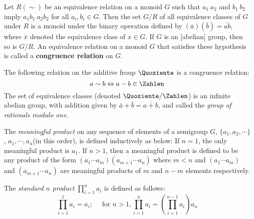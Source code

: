 \begin{theorem}
	Let $ R(\sim) $ be an equivalence relation on a monoid $ G $ such that $ a_1~a_2 $ and $ b_1~b_2 $ imply $ a_1 b_1 ~ a_2 b_2 $ for all $ a_i, b_i \in G $. Then the set $ G/R $ of all equivalence classes of $ G $ under $ R $ is a monoid under the binary operation defined by $ (\bar{a})(\bar{b})=\bar{ab} $, where $ \bar{x} $ denoted the equivalence class of $ x \in G $. If $ G $ is an [abelian] group, then so is $ G/R $.\newpara
	An equivalence relation on a monoid $ G $ that satisfies these hypothesis is called a \textbf{congruence relation} on $ G $.
	
\end{theorem}
\begin{Example}
	The following relation on the additive froup $ \Quoziente $ is a congruence relation:
	\begin{equation}
		a \sim b \Leftrightarrow a-b \in \Zahlen \nonumber
	\end{equation}
	The set of equivalence classes (denoted $ \Quoziente / \Zahlen $) is an infinite abelian group, with addition given by $ \bar{a}+\bar{b}=\bar{a+b} $, and called the \textit{group of rationals modulo one}.
\end{Example}
\begin{definition}
	The \textit{meaningful product} on any sequence of elements of a semigroup $ G $, $ \{a_1,a_2,\cdots\} $, $ a_1,\cdots,a_n $(in this order), is defined inductively as below: If $ n=1 $, the only meaningful product is $ a_1 $. If $ n>1 $, then a meaningful product is defined to be any product of the form $ (a_1\cdots a_m)(a_{m+1}\cdots a_n) $ where $ m<n $ and $ (a_1\cdots a_m) $ and $ (a_{m+1}\cdots a_n) $ are meaningful products of $ m $ and $ n-m $ elements respectively.
\end{definition}
\begin{definition}
	The \textit{standard $ n $ product} $ \prod_{i=1}^{n}a_i $ is defined as follows:
	\begin{equation}
		\prod_{i=1}^{1}a_i=a_i;\quad\text{ for }n>1,\prod_{i=1}^{n}a_i = (\prod_{i=1}^{n-1}a_i)a_n \nonumber
	\end{equation}
\end{definition}

